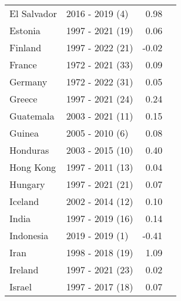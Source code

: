 \begin{table}[H]
{{\begin{tabular}{llrr}
El Salvador & 2016 - 2019 (4) & 0.98\\
\addlinespace
Estonia & 1997 - 2021 (19) & 0.06\\
Finland & 1997 - 2022 (21) & -0.02\\
France & 1972 - 2021 (33) & 0.09\\
Germany & 1972 - 2022 (31) & 0.05\\
Greece & 1997 - 2021 (24) & 0.24\\
\addlinespace
Guatemala & 2003 - 2021 (11) & 0.15\\
Guinea & 2005 - 2010 (6) & 0.08\\
Honduras & 2003 - 2015 (10) & 0.40\\
Hong Kong & 1997 - 2011 (13) & 0.04\\
Hungary & 1997 - 2021 (21) & 0.07\\
\addlinespace
Iceland & 2002 - 2014 (12) & 0.10\\
India & 1997 - 2019 (16) & 0.14\\
Indonesia & 2019 - 2019 (1) & -0.41\\
Iran & 1998 - 2018 (19) & 1.09\\
Ireland & 1997 - 2021 (23) & 0.02\\
\addlinespace
Israel & 1997 - 2017 (18) & 0.07\\
\end{tabular}
}

}
\end{table}
